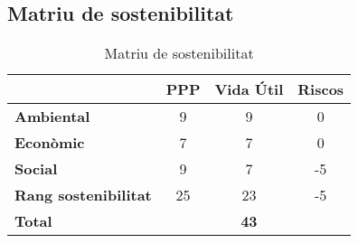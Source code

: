 \subsection{Matriu de sostenibilitat}
\begin{table}[h!]
  \centering
  \label{tab:matriu_sostenibilitat}
  \begin{tabular}{l c c c}
    	 & \textbf{PPP} & \textbf{Vida Útil} & \textbf{Riscos}\\
    	\midrule
    	\textbf{Ambiental}  & 9 & 9 & 0\\
    	\textbf{Econòmic}   & 7 & 7 & 0\\
    	\textbf{Social}     & 9 & 7 & -5 \\
    	\midrule
    	\textbf{Rang sostenibilitat} & 25 & 23 & -5\\
    	\bottomrule
    	\textbf{Total}      & & \textbf{43} & \\
  \end{tabular}
  \caption{Matriu de sostenibilitat}
\end{table}